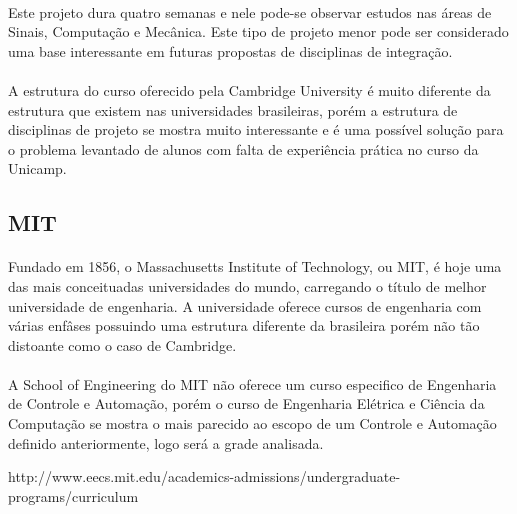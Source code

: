 \documentclass[12pt]{article} %
\begin{document}
\paragraph{} Este projeto dura quatro semanas e nele pode-se observar estudos nas áreas de Sinais, Computação e Mecânica. Este tipo de projeto menor pode ser considerado uma base interessante em futuras propostas de disciplinas de integração.

\paragraph{} A estrutura do curso oferecido pela Cambridge University é muito diferente da estrutura que existem nas universidades brasileiras, porém a estrutura de disciplinas de projeto se mostra muito interessante e é uma possível solução para o problema levantado de alunos
com falta de experiência prática no curso da Unicamp.


\subsection{MIT}

\paragraph{} Fundado em 1856, o Massachusetts Institute of Technology, ou MIT, é hoje uma das mais conceituadas universidades do mundo, carregando o título de melhor universidade de engenharia. A universidade oferece cursos de engenharia com várias enfâses possuindo uma estrutura
diferente da brasileira porém não tão distoante como o caso de Cambridge.

\paragraph{} A School of Engineering do MIT não oferece um curso especifico de Engenharia de Controle e Automação, porém o curso de Engenharia Elétrica e Ciência da Computação se mostra o mais parecido ao escopo de um Controle e Automação definido anteriormente, logo será
a grade analisada.

http://www.eecs.mit.edu/academics-admissions/undergraduate-programs/curriculum
\end{document}
